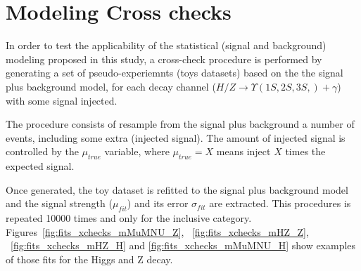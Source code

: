 \clearpage
\section{Modeling Cross checks} \label{modeling_xchecks}

In order to test the applicability of the statistical (signal and background) modeling proposed in this study, a cross-check procedure is performed by generating a set of pseudo-experiemnts (toys datasets) based on the  the signal plus background model, for each decay channel ($H/Z \rightarrow \Upsilon(1S,2S,3S,)+\gamma$) with some signal injected.

The procedure consists of resample from the signal plus background a number of events, including some extra (injected signal). The amount of injected signal is controlled by the $\mu_{true}$ variable, where $\mu_{true} = X$ means inject $X$ times the expected signal.

Once generated, the toy dataset is refitted to the signal plus background model and the signal strength ($\mu_{fit}$) and its error $\sigma_{fit}$ are extracted. This procedures is repeated 10000 times and only for the inclusive category. Figures~\ref{fig:fits_xchecks_mMuMNU_Z}, ~\ref{fig:fits_xchecks_mHZ_Z}, ~\ref{fig:fits_xchecks_mHZ_H} and \ref{fig:fits_xchecks_mMuMNU_H} show examples of those fits for the Higgs and Z decay.


